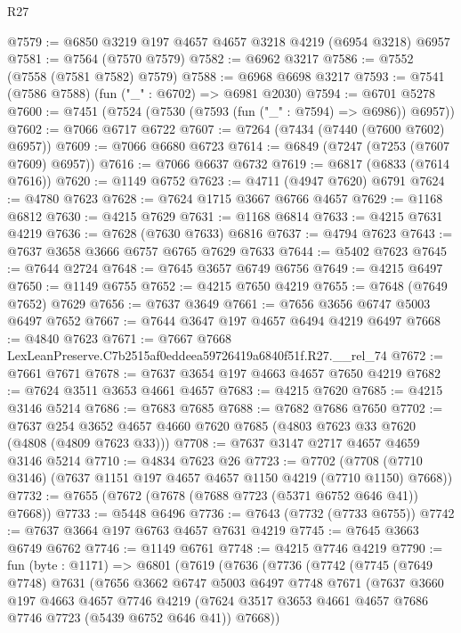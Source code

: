 \begin{lexlean}{R27}
\begin{coremodule}
@7579 := @6850 @3219 @197 @4657 @4657 @3218 @4219 (@6954 @3218) @6957
@7581 := @7564 (@7570 @7579)
@7582 := @6962 @3217
@7586 := @7552 (@7558 (@7581 @7582) @7579)
@7588 := @6968 @6698 @3217
@7593 := @7541 (@7586 @7588) (fun ("_" : @6702) => @6981 @2030)
@7594 := @6701 @5278
@7600 := @7451 (@7524 (@7530 (@7593 (fun ("_" : @7594) => @6986)) @6957))
@7602 := @7066 @6717 @6722
@7607 := @7264 (@7434 (@7440 (@7600 @7602) @6957))
@7609 := @7066 @6680 @6723
@7614 := @6849 (@7247 (@7253 (@7607 @7609) @6957))
@7616 := @7066 @6637 @6732
@7619 := @6817 (@6833 (@7614 @7616))
@7620 := @1149 @6752
@7623 := @4711 (@4947 @7620) @6791
@7624 := @4780 @7623
@7628 := @7624 @1715 @3667 @6766 @4657
@7629 := @1168 @6812
@7630 := @4215 @7629
@7631 := @1168 @6814
@7633 := @4215 @7631 @4219
@7636 := @7628 (@7630 @7633) @6816
@7637 := @4794 @7623
@7643 := @7637 @3658 @3666 @6757 @6765 @7629 @7633
@7644 := @5402 @7623
@7645 := @7644 @2724
@7648 := @7645 @3657 @6749 @6756
@7649 := @4215 @6497
@7650 := @1149 @6755
@7652 := @4215 @7650 @4219
@7655 := @7648 (@7649 @7652) @7629
@7656 := @7637 @3649
@7661 := @7656 @3656 @6747 @5003 @6497 @7652
@7667 := @7644 @3647 @197 @4657 @6494 @4219 @6497
@7668 := @4840 @7623
@7671 := @7667 @7668 LexLeanPreserve.C7b2515af0eddeea59726419a6840f51f.R27.__rel_74
@7672 := @7661 @7671
@7678 := @7637 @3654 @197 @4663 @4657 @7650 @4219
@7682 := @7624 @3511 @3653 @4661 @4657
@7683 := @4215 @7620
@7685 := @4215 @3146 @5214
@7686 := @7683 @7685
@7688 := @7682 @7686 @7650
@7702 := @7637 @254 @3652 @4657 @4660 @7620 @7685 (@4803 @7623 @33 @7620 (@4808 (@4809 @7623 @33)))
@7708 := @7637 @3147 @2717 @4657 @4659 @3146 @5214
@7710 := @4834 @7623 @26
@7723 := @7702 (@7708 (@7710 @3146) (@7637 @1151 @197 @4657 @4657 @1150 @4219 (@7710 @1150) @7668))
@7732 := @7655 (@7672 (@7678 (@7688 @7723 (@5371 @6752 @646 @41)) @7668))
@7733 := @5448 @6496
@7736 := @7643 (@7732 (@7733 @6755))
@7742 := @7637 @3664 @197 @6763 @4657 @7631 @4219
@7745 := @7645 @3663 @6749 @6762
@7746 := @1149 @6761
@7748 := @4215 @7746 @4219
@7790 := fun (byte : @1171) =>
  @6801
    (@7619
      (@7636
        (@7736
          (@7742
            (@7745
              (@7649 @7748)
              @7631
              (@7656
                @3662
                @6747
                @5003
                @6497
                @7748
                @7671
                (@7637
                  @3660
                  @197
                  @4663
                  @4657
                  @7746
                  @4219
                  (@7624 @3517 @3653 @4661 @4657 @7686 @7746 @7723 (@5439 @6752 @646 @41))
                  @7668))

\end{coremodule}
\end{lexlean}
